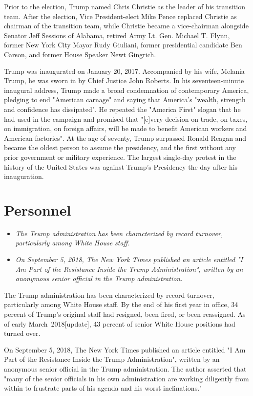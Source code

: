 Prior to the election, Trump named Chris Christie as the leader of his
transition team. After the election, Vice President-elect Mike Pence
replaced Christie as chairman of the transition team, while Christie
became a vice-chairman alongside Senator Jeff Sessions of Alabama,
retired Army Lt. Gen. Michael T. Flynn, former New York City Mayor Rudy
Giuliani, former presidential candidate Ben Carson, and former House
Speaker Newt Gingrich.

Trump was inaugurated on January 20, 2017. Accompanied by his wife,
Melania Trump, he was sworn in by Chief Justice John Roberts. In his
seventeen-minute inaugural address, Trump made a broad condemnation of
contemporary America, pledging to end "American carnage" and saying that
America's "wealth, strength and confidence has dissipated". He repeated
the "America First" slogan that he had used in the campaign and promised
that "{[}e{]}very decision on trade, on taxes, on immigration, on
foreign affairs, will be made to benefit American workers and American
factories". At the age of seventy, Trump surpassed Ronald Reagan and
became the oldest person to assume the presidency, and the first without
any prior government or military experience. The largest single-day
protest in the history of the United States was against Trump's
Presidency the day after his inauguration.

\section{Personnel}\label{personnel}

\begin{itemize}
\item
  \emph{The Trump administration has been characterized by record
  turnover, particularly among White House staff.}
\item
  \emph{On September 5, 2018, The New York Times published an article
  entitled "I Am Part of the Resistance Inside the Trump
  Administration", written by an anonymous senior official in the Trump
  administration.}
\end{itemize}

The Trump administration has been characterized by record turnover,
particularly among White House staff. By the end of his first year in
office, 34 percent of Trump's original staff had resigned, been fired,
or been reassigned. As of early March~2018{[}update{]}, 43 percent of
senior White House positions had turned over.

On September 5, 2018, The New York Times published an article entitled
"I Am Part of the Resistance Inside the Trump Administration", written
by an anonymous senior official in the Trump administration. The author
asserted that "many of the senior officials in his own administration
are working diligently from within to frustrate parts of his agenda and
his worst inclinations."

